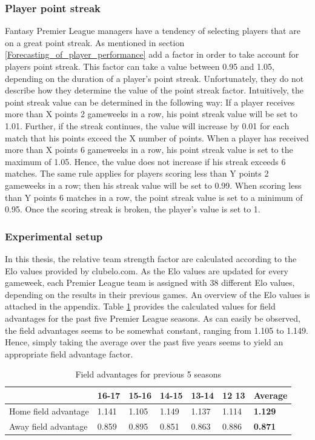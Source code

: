 \subsubsection{Player point streak}
Fantasy Premier League managers have a tendency of selecting players that are on a great point streak. As mentioned in section \ref{Forecasting_of_player_performance} \cite{Bonomo} add a factor in order to take account for players point streak. This factor can take a value between 0.95 and 1.05, depending on the duration of a player's point streak. Unfortunately, they do not describe how they determine the value of the point streak factor. Intuitively, the point streak value can be determined in the following way: 
\newpar
If a player receives more than X points 2 gameweeks in a row, his point streak value will be set to 1.01. Further, if the streak continues, the value will increase by 0.01 for each match that his points exceed the X number of points. When a player has received more than X points 6 gameweeks in a row, his point streak value is set to the maximum of 1.05. Hence, the value does not increase if his streak exceeds 6 matches. The same rule applies for players scoring less than Y points 2 gameweeks in a row; then his streak value will be set to 0.99. When scoring less than Y points 6 matches in a row, the point streak value is set to a minimum of 0.95. Once the scoring streak is broken, the player's value is set to 1. 

\subsubsection{Experimental setup}
In this thesis, the relative team strength factor are calculated according to the Elo values provided by clubelo.com. As the Elo values are updated for every gameweek, each Premier League team is assigned with 38 different Elo values, depending on the results in their previous games. An overview of the Elo values is attached in the appendix. 
\newpar
Table \ref{Field advantage} provides the calculated values for field advantages for the past five Premier League seasons. As can easily be observed, the field advantages seems to be somewhat constant, ranging from 1.105 to 1.149. Hence, simply taking the average over the past five years seems to yield an appropriate field advantage factor. 

\begin{table}[H]
\centering
\caption{Field advantages for previous 5 seasons}
\label{Field advantage}
\begin{tabular}{|l|l|l|l|l|l|l|}
\hline
          & 16-17    & 15-16    & 14-15    & 13-14    & 12 13 & \textbf{Average}   \\
          \hline
        
Home field advantage & 1.141 & 1.105 & 1.149 & 1.137 & 1.114 & \textbf{1.129} \\
\hline
Away field advantage & 0.859 & 0.895 & 0.851 & 0.863 & 0.886 & \textbf{0.871} \\
\hline
\end{tabular}
\end{table}

